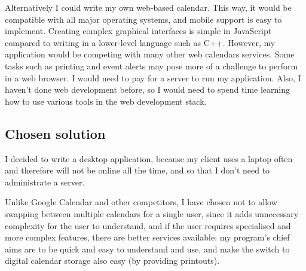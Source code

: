 Alternatively I could write my own web-based calendar. This way, it would be
compatible with all major operating systems, and mobile support is easy to
implement. Creating complex graphical interfaces is simple in JavaScript
compared to writing in a lower-level language such as C++. However, my
application would be competing with many other web calendars services. Some
tasks such as printing and event alerts may pose more of a challenge to perform
in a web browser. I would need to pay for a server to run my application. Also,
I haven't done web development before, so I would need to spend time learning
how to use various tools in the web development stack.


\subsection{Chosen solution}

I decided to write a desktop application, because my client uses a laptop often
and therefore will not be online all the time, and so that I don't need to
administrate a server.

Unlike Google Calendar and other competitors, I have chosen not to allow
swapping between multiple calendars for a single user, since it adds unnecessary
complexity for the user to understand, and if the user requires specialised and
more complex features, there are better services available: my program's chief
aims are to be quick and easy to understand and use, and make the switch to
digital calendar storage also easy (by providing printouts).
